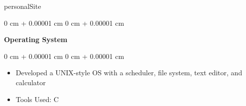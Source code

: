 personalSite\documentclass[10pt, letterpaper]{article}
\newenvironment{highlights}{
    \begin{itemize}[
        topsep=0.10 cm,
        parsep=0.10 cm,
        partopsep=0pt,
        itemsep=0pt,
        leftmargin=0 cm + 10pt
    ]
}{
    \end{itemize}
} %
\newenvironment{onecolentry}{
    \begin{adjustwidth}{
        0 cm + 0.00001 cm
    }{
        0 cm + 0.00001 cm
    }
}{
    \end{adjustwidth}
} %
\newenvironment{twocolentry}[2][]{
    \onecolentry
    \def\secondColumn{#2}
    \setcolumnwidth{\fill, 4.5 cm}
    \begin{paracol}{2}
}{
    \switchcolumn \raggedleft \secondColumn
    \end{paracol}
    \endonecolentry
} %
\begin{document}
        \vspace{0.2 cm}

        \begin{twocolentry}{
            2002
        }
            \textbf{Operating System}\end{twocolentry}

        \vspace{0.10 cm}
        \begin{onecolentry}
            \begin{highlights}
                \item Developed a UNIX-style OS with a scheduler, file system, text editor, and calculator
                \item Tools Used: C
            \end{highlights}
        \end{onecolentry}




    
   


    
\end{document}
